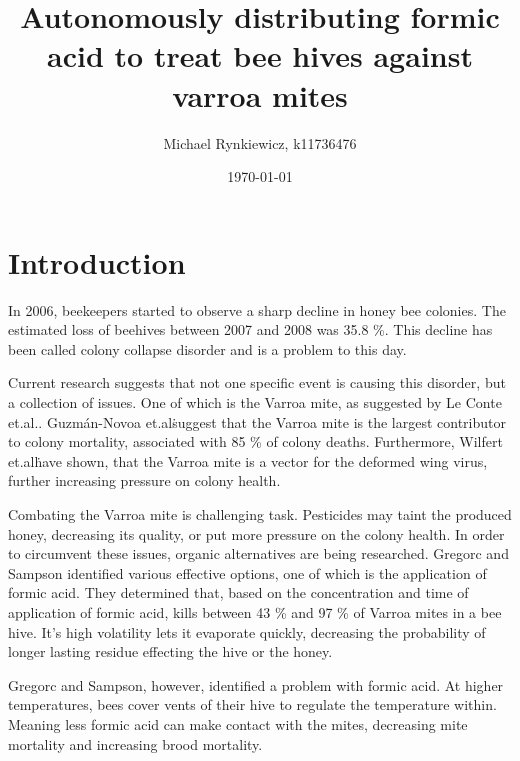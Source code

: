 \documentclass[11pt]{article}
\title{Autonomously distributing formic acid \linebreak to treat bee hives against varroa mites }
\author{Michael Rynkiewicz, k11736476}
\date{\today}
\begin{document}
    \maketitle


    \tableofcontents
    \newpage


    \section{Introduction}\label{sec:introduction}

    In 2006, beekeepers started to observe a sharp decline in honey bee colonies\cite{ColonyCollapseDisorder}.
    The estimated loss of beehives between 2007 and 2008 was 35.8 \%.
    This decline has been called colony collapse disorder and is a problem to this day.

    Current research suggests that not one specific event is causing this disorder, but a collection of issues\cite{VarroaMitesAndHoneyBeeHealth}.
    One of which is the Varroa mite, as suggested by Le Conte et.al.\cite{VarroaMitesAndHoneyBeeHealth}.
    Guzmán-Novoa et.al\. suggest that the Varroa mite is the largest contributor to colony mortality, associated with 85 \% of colony deaths\cite{VarroaDestructorIsTheMainCulprit}.
    Furthermore, Wilfert et.al\. have shown, that the Varroa mite is a vector for the deformed wing virus, further increasing pressure on colony health\cite{DeformedWingVirusDueToVarroa}.

    Combating the Varroa mite is challenging task.
    Pesticides may taint the produced honey, decreasing its quality, or put more pressure on the colony health\cite{PesticidesInHoney}.
    In order to circumvent these issues, organic alternatives are being researched.
    Gregorc and Sampson identified various effective options, one of which is the application of formic acid\cite{DiagnosisOfVarroaMiteAndSustainableControl}.
    They determined that, based on the concentration and time of application of formic acid, kills between 43 \% and 97 \% of Varroa mites in a bee hive.
    It's high volatility lets it evaporate quickly, decreasing the probability of longer lasting residue effecting the hive or the honey.

    Gregorc and Sampson, however, identified a problem with formic acid\cite{DiagnosisOfVarroaMiteAndSustainableControl}.
    At higher temperatures, bees cover vents of their hive to regulate the temperature within.
    Meaning less formic acid can make contact with the mites, decreasing mite mortality and increasing brood mortality.
\end{document}
